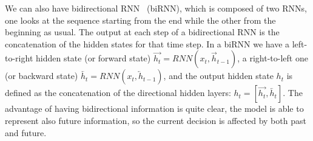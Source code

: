 

We can also have bidirectional RNN~\citep{Schuster1997birnn} (biRNN), which is composed of two RNNs, one looks at the sequence starting from the end while the other from the beginning as usual. The output at each step of a bidirectional RNN is the concatenation of the hidden states for that time step. In a biRNN we have a left-to-right hidden state (or forward state) $\overrightarrow{h_t} = RNN(x_t, \overrightarrow{h}_{t-1})$, a right-to-left one (or backward state) $\overleftarrow{h_t} = RNN(x_t, \overleftarrow{h}_{t-1})$, and the output hidden state $h_t$ is defined as the concatenation of the directional hidden layers: $h_t = [\overrightarrow{h_t}, \overleftarrow{h_t}]$. The advantage of having bidirectional information is quite clear, the model is able to represent also future information, so the current decision is affected by both past and future.

